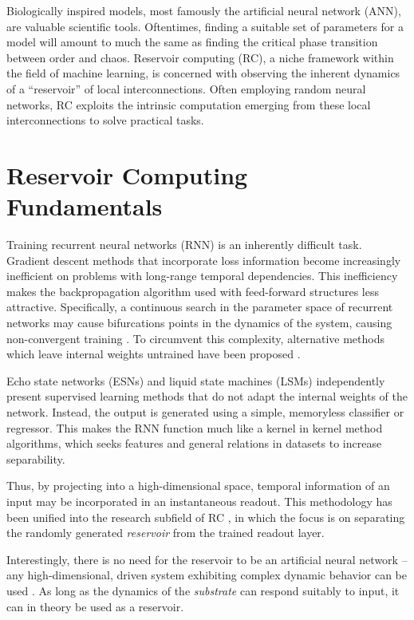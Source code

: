 Biologically inspired models, most famously the artificial neural network (ANN),
are valuable scientific tools. Oftentimes, finding a suitable set of parameters
for a model will amount to much the same as finding the critical phase
transition between order and chaos. Reservoir computing (RC), a niche framework
within the field of machine learning, is concerned with observing the inherent
dynamics of a ``reservoir'' of local interconnections. Often employing random
neural networks, RC exploits the intrinsic computation emerging from these local
interconnections to solve practical tasks.

\section{Reservoir Computing Fundamentals}

Training recurrent neural networks (RNN) is an inherently difficult
task. Gradient descent methods that incorporate loss information become
increasingly inefficient on problems with long-range temporal dependencies. This
inefficiency makes the backpropagation algorithm used with feed-forward
structures less attractive. Specifically, a continuous search in the parameter
space of recurrent networks may cause bifurcations points in the dynamics of the
system, causing non-convergent training \cite{doya_bifurcations_nodate}. To
circumvent this complexity, alternative methods which leave internal weights
untrained have been proposed \cite{jaeger_echo_2001, maass_real-time_2002}.

Echo state networks (ESNs) \cite{jaeger_echo_2001} and liquid state machines
(LSMs) \cite{maass_real-time_2002} independently present supervised learning
methods that do not adapt the internal weights of the network. Instead, the
output is generated using a simple, memoryless classifier or regressor. This
makes the RNN function much like a kernel in kernel method algorithms, which
seeks features and general relations in datasets to increase separability.

Thus, by projecting into a high-dimensional space, temporal information of an
input may be incorporated in an instantaneous readout. This methodology has been
unified into the research subfield of RC \cite{schrauwen_overview_2007}, in
which the focus is on separating the randomly generated \textit{reservoir} from
the trained readout layer.

Interestingly, there is no need for the reservoir to be an artificial neural
network -- any high-dimensional, driven system exhibiting complex dynamic
behavior can be used \cite{schrauwen_overview_2007}. As long as the dynamics of
the \textit{substrate} can respond suitably to input, it can in theory be used
as a reservoir.

